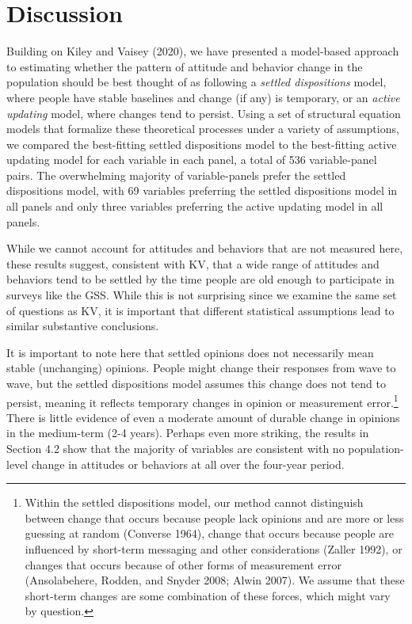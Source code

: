 \documentclass[
  11pt,
]{article}
\begin{document}
\hypertarget{discussion}{%
\section{Discussion}\label{discussion}}

Building on Kiley and Vaisey (2020), we have presented a model-based approach to estimating whether the pattern of attitude and behavior change in the population should be best thought of as following a \emph{settled dispositions} model, where people have stable baselines and change (if any) is temporary, or an \emph{active updating} model, where changes tend to persist. Using a set of structural equation models that formalize these theoretical processes under a variety of assumptions, we compared the best-fitting settled dispositions model to the best-fitting active updating model for each variable in each panel, a total of 536 variable-panel pairs. The overwhelming majority of variable-panels prefer the settled dispositions model, with 69 variables preferring the settled dispositions model in all panels and only three variables preferring the active updating model in all panels.

While we cannot account for attitudes and behaviors that are not measured here, these results suggest, consistent with KV, that a wide range of attitudes and behaviors tend to be settled by the time people are old enough to participate in surveys like the GSS. While this is not surprising since we examine the same set of questions as KV, it is important that different statistical assumptions lead to similar substantive conclusions.

It is important to note here that settled opinions does not necessarily mean stable (unchanging) opinions. People might change their responses from wave to wave, but the settled dispositions model assumes this change does not tend to persist, meaning it reflects temporary changes in opinion or measurement error.\footnote{Within the settled dispositions model, our method cannot distinguish between change that occurs because people lack opinions and are more or less guessing at random (Converse 1964), change that occurs because people are influenced by short-term messaging and other considerations (Zaller 1992), or changes that occurs because of other forms of measurement error (Ansolabehere, Rodden, and Snyder 2008; Alwin 2007). We assume that these short-term changes are some combination of these forces, which might vary by question.} There is little evidence of even a moderate amount of durable change in opinions in the medium-term (2-4 years). Perhaps even more striking, the results in Section 4.2 show that the majority of variables are consistent with no population-level change in attitudes or behaviors at all over the four-year period.
\end{document}

